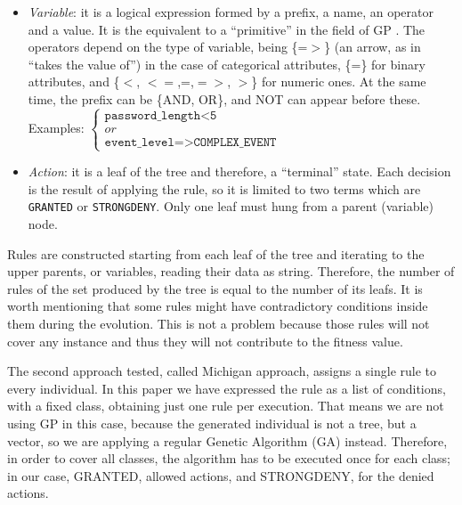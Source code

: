 \documentclass[runningheads]{llncs}
\begin{document}
\begin{itemize}
\item {\em Variable}: it is a logical expression formed by a prefix, a
  name, an operator and a value. It is the equivalent to a
  ``primitive'' in the field of GP \cite{back1996evolutionary}. The
  operators depend on the type of variable, being \{=$>$\} (an arrow, as in ``takes the value of'') in the
  case of categorical attributes, \{=\} for binary attributes, and \{$<$, $<=$,=,$=>$,
  $>$\} for numeric ones. At the same time, the prefix can be \{AND,
  OR\}, and NOT can appear before these. \\ %
    Examples:
   \begin{math}
     \left \{
   \begin{array}{l}
     \texttt{password\_length<5} \\
     or \\
      \texttt{event\_level=>COMPLEX\_EVENT}
   \end{array}
   \right .
   \end{math}
\item {\em Action}: it is a leaf of the tree and therefore, a ``terminal'' state. Each decision is the result of applying the rule, so it is limited to two terms which are \texttt{GRANTED} or \texttt{STRONGDENY}. Only one leaf must hung from a parent (variable) node.
\end{itemize}

Rules are constructed starting from each leaf of the tree and iterating to the upper parents, or variables, reading their data as string. Therefore, the number of rules of the set produced by the tree is equal to the number of its leafs. It is worth mentioning that some rules might have contradictory conditions inside them during the evolution. This is not a problem because those rules will not cover any instance and thus they will not contribute to the fitness value. 

The second approach tested, called Michigan approach, assigns a single
rule to every individual. In this paper we have expressed the rule as
a list of conditions, with a fixed class, obtaining just one rule per
execution. That means we are not using GP in this case, because the
generated individual is not a tree, but a vector, so we are applying a
regular Genetic Algorithm (GA) instead. Therefore, in order to cover
all classes, the algorithm has to be executed once for each class; in
our case, GRANTED, allowed actions, and STRONGDENY, for the denied
actions. 
\end{document}

